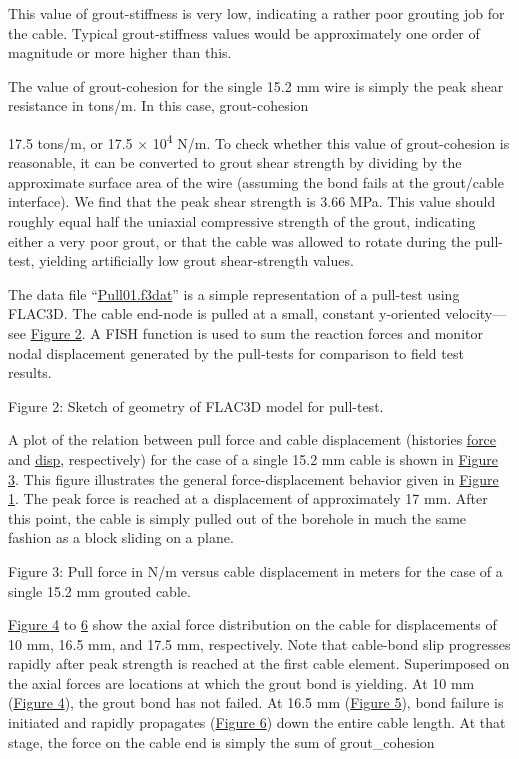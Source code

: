 \documentclass[a4paper, nobind]{templates/ociamthesis}
\begin{document}
This value of grout-stiffness is very low,
indicating a rather poor grouting job for the cable. Typical
grout-stiffness values would be approximately one order of
magnitude or more higher than this.

The value of grout-cohesion for the single 15.2 mm
wire is simply the peak shear resistance in tons/m. In this case,
grout-cohesion

17.5 tons/m, or 17.5 × 10\textsuperscript{4} N/m. To check whether this value of
grout-cohesion is reasonable, it can be converted to grout
shear strength by dividing by the approximate surface area of the wire
(assuming
the bond fails at the grout/cable interface). We find that the peak
shear
strength is 3.66 MPa. This value should roughly equal half the uniaxial
compressive strength of the grout, indicating either a very poor grout,
or that
the cable was allowed to rotate during the pull-test, yielding
artificially low
grout shear-strength values.

The data file ``\protect\hyperlink{pulltest01data}{Pull01.f3dat}'' is a simple
representation
of a pull-test using FLAC3D. The cable end-node is
pulled at a small, constant y-oriented velocity---see \protect\hyperlink{pulltest-geometry}{Figure
2}. A FISH
function is used to sum the reaction forces and monitor nodal
displacement
generated by the pull-tests for comparison to field test results.

Figure 2: Sketch of geometry of FLAC3D model for pull-test.

A plot of the relation between pull force and cable displacement
(histories
\href{../../../../../common/docproject/utilities/types.html\#type:str}{\underline{force}}
and
\href{../../../../../common/docproject/utilities/types.html\#type:str}{\underline{disp}},
respectively) for
the case of a single 15.2 mm cable is shown in \protect\hyperlink{pulltest-cable1}{Figure
3}. This figure illustrates the general
force-displacement behavior given in
\protect\hyperlink{pulltest-fieldresults}{Figure 1}. The peak force is reached at a
displacement of approximately 17 mm. After this point, the cable is
simply
pulled out of the borehole in much the same fashion as a block sliding
on a
plane.

Figure 3: Pull force in N/m versus cable displacement in meters
for the case of a single 15.2 mm grouted cable.

\protect\hyperlink{pulltest-force1}{Figure 4} to \protect\hyperlink{pulltest-force3}{6}
show the axial force distribution on the cable for displacements of 10
mm, 16.5
mm, and 17.5 mm, respectively. Note that cable-bond slip progresses
rapidly
after peak strength is reached at the first cable element. Superimposed
on the
axial forces are locations at which the grout bond is yielding. At 10 mm
(\protect\hyperlink{pulltest-force1}{Figure 4}), the grout bond has not failed. At 16.5
mm
(\protect\hyperlink{pulltest-force2}{Figure 5}), bond failure is initiated and rapidly
propagates (\protect\hyperlink{pulltest-force3}{Figure 6}) down the entire cable
length. At that stage, the force on the cable end is simply the sum of
grout\_cohesion
\end{document}
